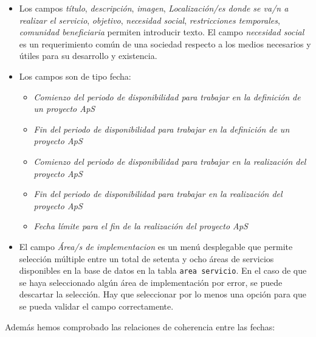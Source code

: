 \documentclass[11pt]{book}
\begin{document}
\begin{itemize} 
	\item Los campos \emph{título}, \emph{descripción}, \emph{imagen}, \emph{Localización/es donde se va/n a realizar el servicio}, \emph{objetivo}, \emph{necesidad social}, \emph{restricciones temporales}, \emph{comunidad beneficiaria} permiten introducir texto. El campo \emph{necesidad social} es un requerimiento común de una sociedad respecto a los medios necesarios y útiles para su desarrollo y existencia.
	\item Los campos son de tipo fecha: 
	\begin{itemize} 
		\item  \emph{Comienzo del periodo de disponibilidad para trabajar en la definición
			de un proyecto ApS}
	 	\item  \emph{Fin del periodo de disponibilidad para trabajar en la definición de un
	 		proyecto ApS} 
 		\item  \emph{Comienzo del periodo de disponibilidad para trabajar en la realización
 			del proyecto ApS}
 		\item  \emph{Fin del periodo de disponibilidad para trabajar en la realización del
 			proyecto ApS} 
 		\item  \emph{Fecha límite para el fin de la realización del proyecto ApS}
 	\end{itemize}

	\item El campo \emph{Área/s de implementacion} es un menú desplegable que permite selección múltiple entre un total de setenta y ocho áreas de servicios disponibles en la base de datos en la tabla  \texttt{area servicio}. En el caso de que se haya seleccionado algún área de implementación por error, se puede descartar la selección. Hay que seleccionar por lo menos una opción para que se pueda validar el campo correctamente.
\end{itemize}
Además hemos comprobado las relaciones de coherencia entre las fechas:
\end{document}
